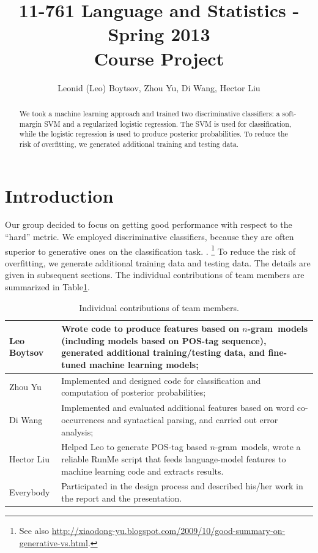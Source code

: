 \documentclass[11pt]{article}
\newcommand{\ngram}{\mbox{$n$-gram }}
\newcommand{\leocomment}[1]{\todo[color=red!40,caption={Leo's comment}]{#1}}
\begin{document}
\title{11-761 Language and Statistics - Spring 2013\\
Course Project}
\author{Leonid (Leo) Boytsov, Zhou Yu, Di Wang, Hector Liu}
\date{}
\maketitle

\begin{abstract}
We took a machine learning approach and trained two discriminative classifiers:
a soft-margin SVM and a regularized logistic regression.
The SVM is used for classification, while the logistic regression is used to produce posterior probabilities.
To reduce the risk of overfitting, we generated additional training and testing data.
\end{abstract}


\section{Introduction}
Our group decided to focus on getting good performance with respect to the ``hard'' metric.
We employed discriminative classifiers,
because they are often superior to generative ones on the classification task. \leocomment{I have simplified here.}\cite{roni2013,bishop2007generative}.
\footnote{See also \url{http://xiaodong-yu.blogspot.com/2009/10/good-summary-on-generative-vs.html}.}
To reduce the risk of overfitting, we generate additional training data and testing data.
The details are given in subsequent sections. The individual contributions of team members are summarized in Table\ref{TableContrib}.


\leocomment{Please, revise.}
\begin{table}[H]
\begin{tabular}{p{1in}|p{5in}}
\hline
Leo Boytsov &  Wrote code to produce features based on \ngram models (including models based on POS-tag sequence), generated additional training/testing data, and fine-tuned machine learning models;
\\\hline
Zhou Yu & Implemented and designed code for classification and computation of posterior probabilities;
\\\hline
Di Wang & Implemented and evaluated additional features based on word co-occurrences and syntactical parsing, and
carried out error analysis;
\\\hline
Hector Liu & Helped Leo to generate POS-tag based \ngram models, wrote a
reliable RunMe script that feeds language-model features to machine learning code
and extracts results.
\\\hline
Everybody & Participated in the design process and described his/her work
in the report and the presentation.
\\\hline
\end{tabular}

\caption{\label{TableContrib}Individual contributions of team members.}
\end{table}
\end{document}
